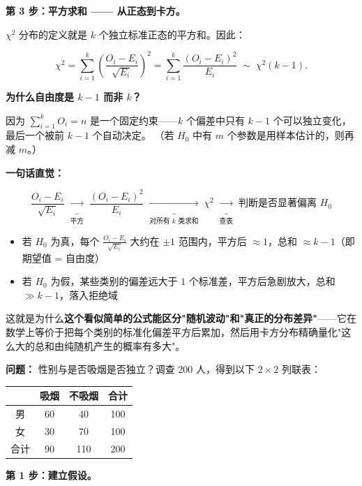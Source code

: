 \medskip
\textbf{第 3 步：平方求和 —— 从正态到卡方。}

$\chi^2$ 分布的定义就是 $k$ 个独立标准正态的平方和。因此：

\begin{equation}
    \boxed{\chi^2 = \sum_{i=1}^{k} \left(\frac{O_i - E_i}{\sqrt{E_i}}\right)^2
                 = \sum_{i=1}^{k} \frac{(O_i - E_i)^2}{E_i}
                 \;\sim\; \chi^2(k-1)}.
\end{equation}

\textbf{为什么自由度是 $k-1$ 而非 $k$？}

因为 $\sum_{i=1}^{k} O_i = n$ 是一个固定约束——$k$ 个偏差中只有 $k-1$ 个可以独立变化，最后一个被前 $k-1$ 个自动决定。
（若 $H_0$ 中有 $m$ 个参数是用样本估计的，则再减 $m$。）

\medskip
\textbf{一句话直觉：}

\[
\frac{O_i - E_i}{\sqrt{E_i}}
\;\underbrace{\longrightarrow}_{\text{平方}}\;
\frac{(O_i - E_i)^2}{E_i}
\;\underbrace{\longrightarrow}_{\text{对所有 $k$ 类求和}}\;
\chi^2
\;\underbrace{\longrightarrow}_{\text{查表}}\;
\text{判断是否显著偏离 } H_0
\]

\begin{itemize}
    \item 若 $H_0$ 为真，每个 $\frac{O_i - E_i}{\sqrt{E_i}}$ 大约在 $\pm 1$ 范围内，平方后 $\approx 1$，总和 $\approx k-1$（即期望值 = 自由度）
    \item 若 $H_0$ 为假，某些类别的偏差远大于 $1$ 个标准差，平方后急剧放大，总和 $\gg k-1$，落入拒绝域
\end{itemize}

这就是为什么\textbf{这个看似简单的公式能区分"随机波动"和"真正的分布差异"}——它在数学上等价于把每个类别的标准化偏差平方后累加，然后用卡方分布精确量化"这么大的总和由纯随机产生的概率有多大"。

\textbf{问题：} 性别与是否吸烟是否独立？调查 200 人，得到以下 $2 \times 2$ 列联表：

\begin{center}
\begin{tabular}{c|cc|c}
\toprule
& 吸烟 & 不吸烟 & 合计 \\
\midrule
男 & 60 & 40 & 100 \\
女 & 30 & 70 & 100 \\
\midrule
合计 & 90 & 110 & 200 \\
\bottomrule
\end{tabular}
\end{center}

\textbf{第 1 步：建立假设。}

